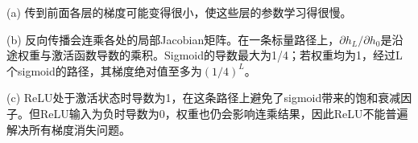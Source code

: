 (a) 传到前面各层的梯度可能变得很小，使这些层的参数学习得很慢。


(b) 反向传播会连乘各处的局部Jacobian矩阵。在一条标量路径上，\(\partial h_L/\partial h_0\)是沿途权重与激活函数导数的乘积。Sigmoid的导数最大为1/4；若权重均为1，经过L个sigmoid的路径，其梯度绝对值至多为\((1/4)^L\)。


(c) ReLU处于激活状态时导数为1，在这条路径上避免了sigmoid带来的饱和衰减因子。但ReLU输入为负时导数为0，权重也仍会影响连乘结果，因此ReLU不能普遍解决所有梯度消失问题。
